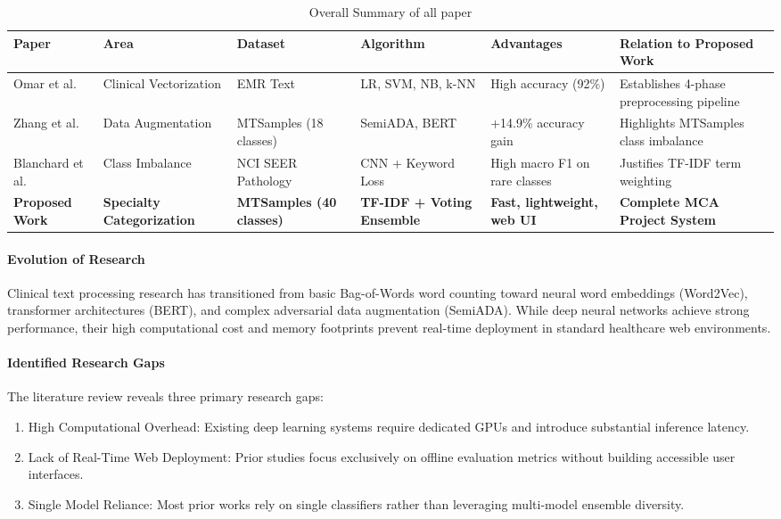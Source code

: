 \begin{table}[H]
\centering
\small
\setlength{\tabcolsep}{4pt}
\begin{tabularx}{\linewidth}{|>{\raggedright\arraybackslash}p{2.1cm}|>{\raggedright\arraybackslash}p{2.0cm}|>{\raggedright\arraybackslash}p{2.0cm}|>{\raggedright\arraybackslash}X|>{\raggedright\arraybackslash}p{2.2cm}|>{\raggedright\arraybackslash}X|}
\hline
\textbf{Paper} & \textbf{Area} & \textbf{Dataset} & \textbf{Algorithm} & \textbf{Advantages} & \textbf{Relation to Proposed Work} \\
\hline
Omar et al. \cite{omar2023} & Clinical Vectorization & EMR Text & LR, SVM, NB, k-NN & High accuracy (92\%) & Establishes 4-phase preprocessing pipeline \\
\hline
Zhang et al. \cite{zhang2023} & Data Augmentation & MTSamples (18 classes) & SemiADA, BERT & +14.9\% accuracy gain & Highlights MTSamples class imbalance \\
\hline
Blanchard et al. \cite{blanchard2022} & Class Imbalance & NCI SEER Pathology & CNN + Keyword Loss & High macro F1 on rare classes & Justifies TF-IDF term weighting \\
\hline
\textbf{Proposed Work} & \textbf{Specialty Categorization} & \textbf{MTSamples (40 classes)} & \textbf{TF-IDF + Voting Ensemble} & \textbf{Fast, lightweight, web UI} & \textbf{Complete MCA Project System} \\
\hline
\end{tabularx}
\caption{Overall Summary of all paper}
\label{tab:overall_summary}
\end{table}

\paragraph{Evolution of Research}
Clinical text processing research has transitioned from basic Bag-of-Words word counting toward neural word embeddings (Word2Vec), transformer architectures (BERT), and complex adversarial data augmentation (SemiADA). While deep neural networks achieve strong performance, their high computational cost and memory footprints prevent real-time deployment in standard healthcare web environments.

\paragraph{Identified Research Gaps}
The literature review reveals three primary research gaps:
\begin{enumerate}
    \item High Computational Overhead: Existing deep learning systems require dedicated GPUs and introduce substantial inference latency.
    \item Lack of Real-Time Web Deployment: Prior studies focus exclusively on offline evaluation metrics without building accessible user interfaces.
    \item Single Model Reliance: Most prior works rely on single classifiers rather than leveraging multi-model ensemble diversity.
\end{enumerate}

